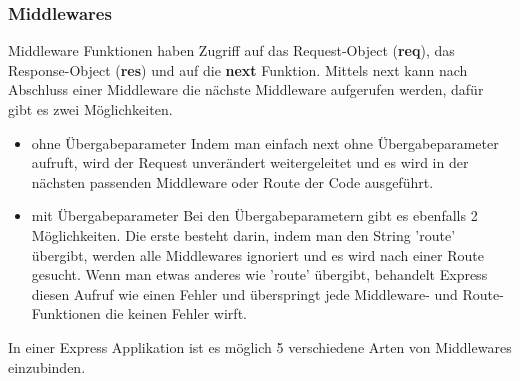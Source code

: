 \subsubsection{Middlewares}
Middleware Funktionen haben Zugriff auf das Request-Object (\textbf{req}), das Response-Object (\textbf{res}) und auf die \textbf{next} Funktion. Mittels next kann nach Abschluss einer Middleware die nächste Middleware aufgerufen werden, dafür gibt es zwei Möglichkeiten.
\begin{itemize}
    \item ohne Übergabeparameter
        \newline
        Indem man einfach next ohne Übergabeparameter aufruft, wird der Request unverändert weitergeleitet und es wird in der nächsten passenden Middleware oder Route der Code ausgeführt.
    \item mit Übergabeparameter
        \newline
        Bei den Übergabeparametern gibt es ebenfalls 2 Möglichkeiten. Die erste besteht darin, indem man den String 'route' übergibt, werden alle Middlewares ignoriert und es wird nach einer Route gesucht. Wenn man etwas anderes wie 'route' übergibt, behandelt Express diesen Aufruf wie einen Fehler und überspringt jede Middleware- und Route-Funktionen die keinen Fehler wirft.
\end{itemize}

\newline
In einer Express Applikation ist es möglich 5 verschiedene Arten von Middlewares einzubinden.

